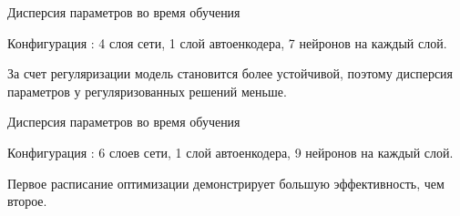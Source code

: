 \documentclass[9pt,pdf,hyperref={unicode}]{beamer}
\begin{document}
\begin{frame}{Дисперсия параметров во время обучения}
\begin{center}
Конфигурация : 4 слоя сети, 1 слой автоенкодера, 7 нейронов на каждый слой.
\begin{figure}[h!]
\label{fig:opt schedule 2}
\end{figure}
За счет регуляризации модель становится более устойчивой, поэтому дисперсия параметров у регуляризованных решений меньше.
\end{center}
\end{frame}
\begin{frame}{Дисперсия параметров во время обучения}
\begin{center}
Конфигурация : 6 слоев сети, 1 слой автоенкодера, 9 нейронов на каждый слой.
\begin{figure}[h!]

\label{fig:opt schedule 2}
\end{figure}
Первое расписание оптимизации демонстрирует большую эффективность, чем второе.
\end{center}
\end{frame}
\end{document}
